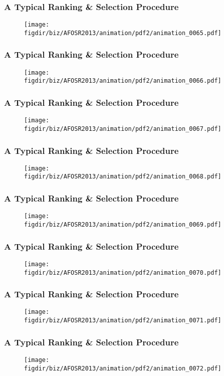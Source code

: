 \documentclass[13pt]{beamer}
\newcommand{\figdir}{../../fig}
\begin{document}
{\begin{frame}\frametitle{A Typical Ranking \& Selection Procedure}\begin{figure}\texttt{[image: \\figdir/biz/AFOSR2013/animation/pdf2/animation\_0065.pdf]}\end{figure}\end{frame}
\begin{frame}\frametitle{A Typical Ranking \& Selection Procedure}\begin{figure}\texttt{[image: \\figdir/biz/AFOSR2013/animation/pdf2/animation\_0066.pdf]}\end{figure}\end{frame}
\begin{frame}\frametitle{A Typical Ranking \& Selection Procedure}\begin{figure}\texttt{[image: \\figdir/biz/AFOSR2013/animation/pdf2/animation\_0067.pdf]}\end{figure}\end{frame}
\begin{frame}\frametitle{A Typical Ranking \& Selection Procedure}\begin{figure}\texttt{[image: \\figdir/biz/AFOSR2013/animation/pdf2/animation\_0068.pdf]}\end{figure}\end{frame}
\begin{frame}\frametitle{A Typical Ranking \& Selection Procedure}\begin{figure}\texttt{[image: \\figdir/biz/AFOSR2013/animation/pdf2/animation\_0069.pdf]}\end{figure}\end{frame}
\begin{frame}\frametitle{A Typical Ranking \& Selection Procedure}\begin{figure}\texttt{[image: \\figdir/biz/AFOSR2013/animation/pdf2/animation\_0070.pdf]}\end{figure}\end{frame}
\begin{frame}\frametitle{A Typical Ranking \& Selection Procedure}\begin{figure}\texttt{[image: \\figdir/biz/AFOSR2013/animation/pdf2/animation\_0071.pdf]}\end{figure}\end{frame}
\begin{frame}\frametitle{A Typical Ranking \& Selection Procedure}\begin{figure}\texttt{[image: \\figdir/biz/AFOSR2013/animation/pdf2/animation\_0072.pdf]}\end{figure}\end{frame}
}
\end{document}
